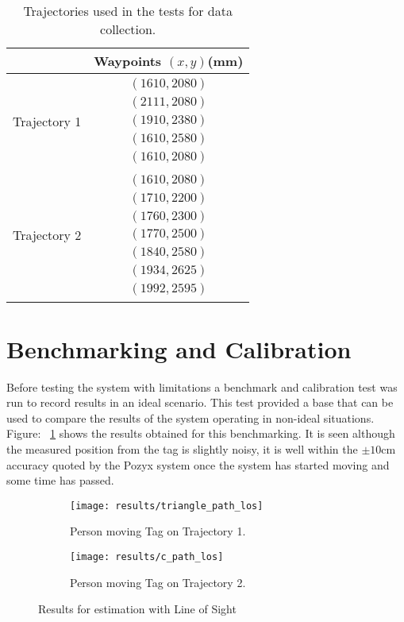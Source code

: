 \begin{table}[ht!]
    \centering
    \begin{tabular}{|c|c|}
        \hline
        & Waypoints $(x,y)$(mm)\\
        \hline
        Trajectory 1 & $\begin{array}{c}
                            (1610, 2080)\\
                            (2111, 2080)\\
                            (1910, 2380)\\
                            (1610, 2580)\\
                            (1610, 2080)
        \end{array}$\\
        \hline
        Trajectory 2 & $\begin{array}{c}
                            (1610, 2080)\\
                            (1710, 2200)\\
                            (1760, 2300)\\
                            (1770, 2500)\\
                            (1840, 2580)\\
                            (1934, 2625)\\
                            (1992, 2595)
        \end{array}$\\
        \hline
    \end{tabular}
    \caption{Trajectories used in the tests for data collection.}
    \label{tb:trajs}
\end{table}
\newpage
\section{Benchmarking and Calibration}\label{sec:benchmarking}
Before testing the system with limitations a benchmark and calibration test was run to record results in an ideal scenario.
This test provided a base that can be used to compare the results of the system operating in non-ideal situations.
Figure: ~\ref{fig:los} shows the results obtained for this benchmarking.
It is seen although the measured position from the tag is slightly noisy, it is well within the $\pm10$cm accuracy quoted by the Pozyx system once the system has started moving and some time has passed.
\begin{figure}[h!]
    \centering
    \begin{subfigure}{0.49\textwidth}
            \texttt{[image: results/triangle\_path\_los]}
            \caption{Person moving Tag on Trajectory 1.}
    \end{subfigure}
    \begin{subfigure}{0.49\textwidth}
            \texttt{[image: results/c\_path\_los]}
            \caption{Person moving Tag on Trajectory 2.}
    \end{subfigure}
    \caption{Results for estimation with Line of Sight}
    \label{fig:los}
\end{figure}
